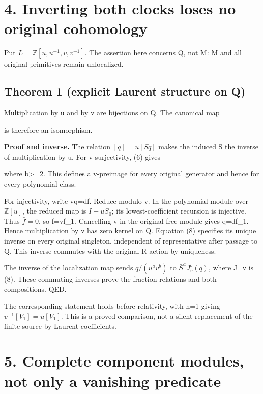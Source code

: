 \section{4. Inverting both clocks loses no original cohomology}

Put \(L=\mathbb Z[u,u^{-1},v,v^{-1}]\). The assertion here concerns Q,
not M: M and all original primitives remain unlocalized.

\subsection{Theorem 1 (explicit Laurent structure on Q)}

Multiplication by u and by v are bijections on Q. The canonical map


is therefore an isomorphism.

\textbf{Proof and inverse.} The relation \([q]=u[S q]\) makes the
induced S the inverse of multiplication by u. For v-surjectivity, (6)
gives


where b\textgreater=2. This defines a v-preimage for every original
generator and hence for every polynomial class.

For injectivity, write vq=df. Reduce modulo v. In the polynomial module
over \(\mathbb Z[u]\), the reduced map is \(I-uS_0\); its
lowest-coefficient recursion is injective. Thus \(\bar f=0\), so
f=vf\_1. Cancelling v in the original free module gives q=df\_1. Hence
multiplication by v has zero kernel on Q. Equation (8) specifies its
unique inverse on every original singleton, independent of
representative after passage to Q. This inverse commutes with the
original R-action by uniqueness.

The inverse of the localization map sends \(q/(u^a v^b)\) to
\(\bar S^a J_v^b(q)\), where J\_v is (8). These commuting inverses prove
the fraction relations and both compositions. QED.

The corresponding statement holds before relativity, with n=1 giving
\(v^{-1}[V_1]=u[V_1]\). This is a proved comparison, not a silent
replacement of the finite source by Laurent coefficients.

\section{5. Complete component modules, not only a vanishing predicate}

